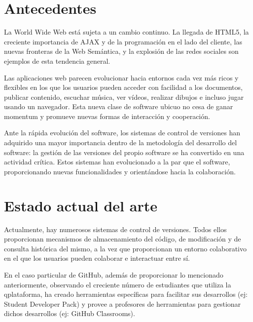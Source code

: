 
\section{Antecedentes}
\label{1:sec:1}

La World Wide Web está sujeta a un cambio continuo. La llegada de HTML5, la creciente importancia
de AJAX y de la programación en el lado del cliente, las nuevas fronteras de la Web Semántica, y la
explosión de las redes sociales son ejemplos de esta tendencia general.
\bigskip

Las aplicaciones web parecen evolucionar hacia entornos cada vez más ricos y flexibles en los que
los usuarios pueden acceder con facilidad a los documentos, publicar contenido, escuchar música, ver
vídeos, realizar dibujos e incluso jugar usando un navegador. Esta nueva clase de software ubicuo no
cesa de ganar momentum y promueve nuevas formas de interacción y cooperación.
\bigskip

Ante la rápida evolución del software, los sistemas de control de versiones han adquirido una mayor importancia dentro de la metodología del desarrollo del software: la gestión de las versiones del propio software se ha convertido en una actividad crítica. Estos sistemas han evolucionado a la par que el software, proporcionando nuevas funcionalidades y orientándose hacia la colaboración.

\section{Estado actual del arte}
\label{1:sec:2}

Actualmente, hay numerosos sistemas de control de versiones. Todos ellos proporcionan mecanismos de almacenamiento del código, de modificación y de consulta histórica del mismo, a la vez que proporcionan un entorno colaborativo en el que los usuarios pueden colaborar e interactuar entre sí.

En el caso particular de GitHub, además de proporcionar lo mencionado anteriormente, observando el creciente número de estudiantes que utiliza la qplataforma, ha creado herramientas específicas para facilitar sus desarrollos (ej: Student Developer Pack) y provee a profesores de herramientas para gestionar dichos desarrollos (ej: GitHub Classrooms).

